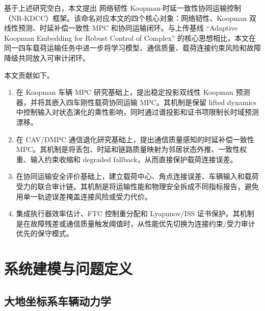\documentclass[twocolumn,3p,times,procedia]{elsarticle}
\newif\ifNRReview
\newcommand{\reviewblock}[1]{\ifNRReview\par\smallskip\noindent\begingroup\setlength{\fboxsep}{4pt}\colorbox{yellow!35}{\parbox{0.96\linewidth}{\footnotesize\textbf{当前不足：} #1}}\endgroup\par\smallskip\fi}
\newcommand{\AKE}{AKE-M}
\newcommand{\Method}{NR-KDCC}
\newcommand{\MethodCN}{网络韧性 Koopman-时延一致性协同运输控制}
\begin{document}
基于上述研究空白，本文提出 \MethodCN{}（\Method{}）框架。该命名对应本文的四个核心对象：网络韧性、Koopman 双线性预测、时延补偿一致性 MPC 和协同运输闭环。与上传基线 ``Adaptive Koopman Embedding for Robust Control of Complex'' 的核心思想相比，本文在同一四车载荷运输任务中进一步将学习模型、通信质量、载荷连接约束风险和故障降级共同放入可审计闭环。
\reviewblock{当前主基线是任务对齐的 \AKE{} 机制基线，不是上传原文 AKE-A 的完整复现；投稿前若要强化顶刊说服力，需要补严格 AKE-A 复现或强物理/DMPC baseline。}

本文贡献如下。

\begin{enumerate}
\item 在 Koopman 车辆 MPC 研究基础上，提出稳定投影双线性 Koopman 预测器，并将其嵌入四车刚性载荷协同运输 MPC。其机制是保留 lifted dynamics 中控制输入对状态演化的乘性影响，同时通过谱投影和证书项限制长时域预测漂移。
\item 在 CAV/DMPC 通信退化研究基础上，提出通信质量感知的时延补偿一致性 MPC。其机制是将丢包、时延和链路质量映射为邻居状态外推、一致性权重、输入约束收缩和 degraded fallback，从而直接保护载荷连接误差。
\item 在协同运输安全评价基础上，建立载荷中心、角点连接误差、车辆输入和载荷受力的联合审计链。其机制是将运输性能和物理安全拆成不同指标报告，避免用单一轨迹误差掩盖连接风险或受力代价。
\item 集成执行器效率估计、FTC 控制重分配和 Lyapunov/ISS 证书保护。其机制是在故障残差或通信质量触发阈值时，从性能优先切换为连接约束/受力审计优先的保守模式。
\end{enumerate}

\section{系统建模与问题定义}

\subsection{大地坐标系车辆动力学}
\end{document}

